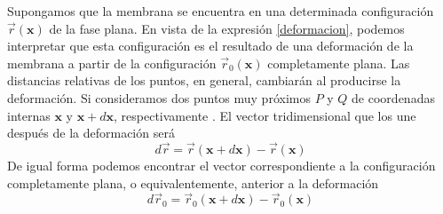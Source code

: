 Supongamos que la membrana se encuentra en una determinada configuración
$\vec{r}(\mathbf{x})$ de la fase plana. En vista de la expresión
\eqref{deformacion}, podemos interpretar que esta configuración es el
resultado de una deformación de la membrana a partir de la configuración
$\vec{r}_0(\mathbf{x})$ completamente plana. Las distancias relativas de los
puntos, en general, cambiarán al producirse la deformación. Si
consideramos dos puntos muy próximos $P$ y $Q$ de coordenadas internas
$\mathbf{x}$ y $\mathbf{x}+d\mathbf{x}$, respectivamente \cite{Landau_Elasticidad}. El vector tridimensional que los une
después de la deformación será
\begin{equation}\label{dr}
d\vec{r}= \vec{r}(\mathbf{x}+d\mathbf{x})-\vec{r}(\mathbf{x})
\end{equation}
De igual forma podemos encontrar el vector correspondiente a la configuración
completamente plana, o equivalentemente, anterior a la deformación
\begin{equation}\label{dr0}
d\vec{r}_0= \vec{r}_0(\mathbf{x}+d\mathbf{x})-\vec{r}_0(\mathbf{x})
\end{equation}

